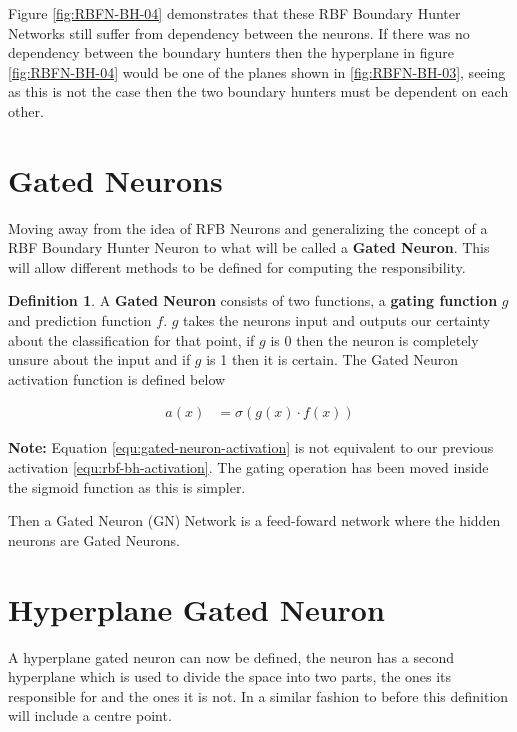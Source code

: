 \documentclass[notitlepage]{report}
\theoremstyle{definition}
\newtheorem{definition}{Definition}[section]
\begin{document}
Figure \ref{fig:RBFN-BH-04} demonstrates that these RBF Boundary Hunter Networks still suffer from dependency between the neurons. If there was no dependency between the boundary hunters then the hyperplane in figure \ref{fig:RBFN-BH-04} would be one of the planes shown in \ref{fig:RBFN-BH-03}, seeing as this is not the case then the two boundary hunters must be dependent on each other.

\section{Gated Neurons}
Moving away from the idea of RFB Neurons and generalizing the concept of a RBF Boundary Hunter Neuron to what will be called a \textbf{Gated Neuron}. This will allow different methods to be defined for computing the responsibility.

\theoremstyle{definition}
\begin{definition}
A \textbf{Gated Neuron} consists of two functions, a \textbf{gating function} $g$ and prediction function $f$. $g$ takes the neurons input and outputs our certainty about the classification for that point, if $g$ is 0 then the neuron is completely unsure about the input and if $g$ is 1 then it is certain. The Gated Neuron activation function is defined below

\begin{align}
a(x) &= \sigma(g(x) \cdot f(x))
\label{equ:gated-neuron-activation}
\end{align}

\textbf{Note: } Equation \ref{equ:gated-neuron-activation} is not equivalent to our previous activation \ref{equ:rbf-bh-activation}. The gating operation has been moved inside the sigmoid function as this is simpler.

\end{definition}

Then a Gated Neuron (GN) Network is a feed-foward network where the hidden neurons are Gated Neurons.

\section{Hyperplane Gated Neuron}
A hyperplane gated neuron can now be defined, the neuron has a second hyperplane which is used to divide the space into two parts, the ones its responsible for and the ones it is not. In a similar fashion to before this definition will include a centre point.
\end{document}
